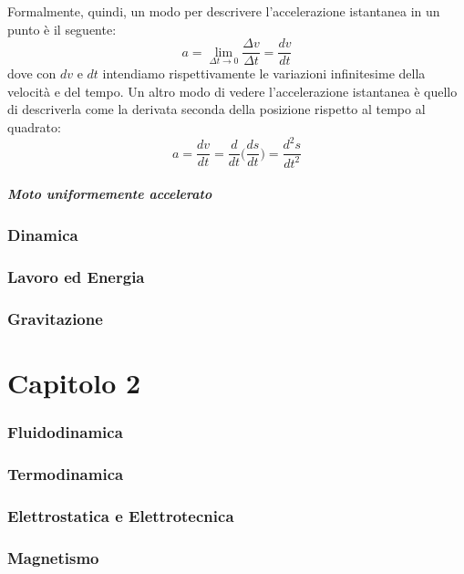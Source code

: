 \documentclass[11pt]{article}
\begin{document}
Formalmente, quindi, un modo per descrivere l'accelerazione istantanea in un punto è il seguente:
\begin{equation}
a=\lim_{\Delta t \to 0} \dfrac{\Delta v}{\Delta t} = \dfrac{dv}{dt}
\end{equation}
dove con $dv$ e $dt$ intendiamo rispettivamente le variazioni infinitesime della velocità e del tempo.
Un altro modo di vedere l'accelerazione istantanea è quello di descriverla come la derivata seconda della posizione rispetto al tempo al quadrato:
\begin{equation}
 a= \dfrac{dv}{dt}= \dfrac{d}{dt}\Bigg( \dfrac{ds}{dt}\Bigg) = \dfrac{d^2s}{dt^2}
 \end{equation} 

\subsubsection{Moto uniformemente accelerato}
\section{Dinamica}
\section{Lavoro ed Energia}
\section{Gravitazione}
\part{Capitolo 2}
\section{Fluidodinamica}

\section{Termodinamica}

\section{Elettrostatica e Elettrotecnica}

\section{Magnetismo}
\end{document}
